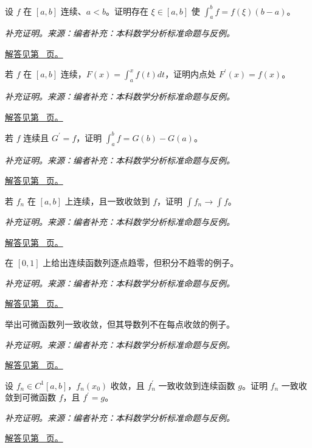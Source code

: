 \documentclass[UTF8,12pt,a4paper,fontset=fandol]{ctexart}
\begin{document}
\begin{example}[积分平均值定理]\label{ex:c30q7}
设 $f$ 在 $[a,b]$ 连续、$a<b$。证明存在 $\xi\in[a,b]$ 使 $\int_a^bf=f(\xi)(b-a)$。
\par\textit{补充证明。来源：编者补充：本科数学分析标准命题与反例。}\par\hyperref[ans:c30q7]{解答见第~\pageref{ans:c30q7} 页。}
\end{example}
\begin{example}[基本定理的局部证明]\label{ex:c30q8}
若 $f$ 在 $[a,b]$ 连续，$F(x)=\int_a^xf(t)dt$，证明内点处 $F^{\prime}(x)=f(x)$。
\par\textit{补充证明。来源：编者补充：本科数学分析标准命题与反例。}\par\hyperref[ans:c30q8]{解答见第~\pageref{ans:c30q8} 页。}
\end{example}
\begin{example}\label{ex:c30q9}
若 $f$ 连续且 $G^{\prime}=f$，证明 $\int_a^bf=G(b)-G(a)$。
\par\textit{补充证明。来源：编者补充：本科数学分析标准命题与反例。}\par\hyperref[ans:c30q9]{解答见第~\pageref{ans:c30q9} 页。}
\end{example}
\begin{example}[一致收敛与积分交换]\label{ex:c30q10}
若 $f_n$ 在 $[a,b]$ 上连续，且一致收敛到 $f$，证明 $\int f_n\to\int f$。
\par\textit{补充证明。来源：编者补充：本科数学分析标准命题与反例。}\par\hyperref[ans:c30q10]{解答见第~\pageref{ans:c30q10} 页。}
\end{example}
\begin{example}[逐点收敛不足以交换积分]\label{ex:c30q11}
在 $[0,1]$ 上给出连续函数列逐点趋零，但积分不趋零的例子。
\par\textit{补充证明。来源：编者补充：本科数学分析标准命题与反例。}\par\hyperref[ans:c30q11]{解答见第~\pageref{ans:c30q11} 页。}
\end{example}
\begin{example}[一致收敛不自动保持导数]\label{ex:c30q12}
举出可微函数列一致收敛，但其导数列不在每点收敛的例子。
\par\textit{补充证明。来源：编者补充：本科数学分析标准命题与反例。}\par\hyperref[ans:c30q12]{解答见第~\pageref{ans:c30q12} 页。}
\end{example}
\begin{example}[逐项求导的一个充分条件]\label{ex:c30q13}
设 $f_n\in C^1[a,b]$，$f_n(x_0)$ 收敛，且 $f_n^{\prime}$ 一致收敛到连续函数 $g$。证明 $f_n$ 一致收敛到可微函数 $f$，且 $f^{\prime}=g$。
\par\textit{补充证明。来源：编者补充：本科数学分析标准命题与反例。}\par\hyperref[ans:c30q13]{解答见第~\pageref{ans:c30q13} 页。}
\end{example}
\end{document}
